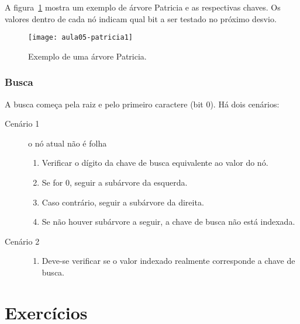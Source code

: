 A figura~\ref{aula05:fig:patricia1} mostra um exemplo de árvore Patricia e as
respectivas chaves.
Os valores dentro de cada nó indicam qual bit a ser testado no próximo desvio.
%
\begin{figure}[!htb]
\centering
\texttt{[image: aula05-patricia1]}
\caption{Exemplo de uma árvore Patricia.}
\label{aula05:fig:patricia1}
\end{figure}

\subsubsection{Busca}

A busca começa pela raiz e pelo primeiro caractere (bit 0). 
Há dois cenários:
\begin{description}
\item[Cenário 1] o nó atual não é folha
	\begin{enumerate}
	\item Verificar o dígito da chave de busca equivalente ao valor do nó.
	\item Se for 0, seguir a subárvore da esquerda.
	\item Caso contrário, seguir a subárvore da direita.
	\item Se não houver subárvore a seguir, a chave de busca não está indexada.
	\end{enumerate}

\item[Cenário 2]
	\begin{enumerate}
	\item Deve-se verificar se o valor indexado realmente corresponde a chave de busca.
	\end{enumerate}
\end{description}


\section{Exercícios}

